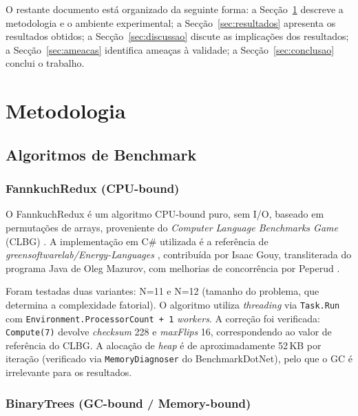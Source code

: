 \documentclass[12pt,a4paper]{article}
\begin{document}
O restante documento está organizado da seguinte forma: a Secção~\ref{sec:metodologia}
descreve a metodologia e o ambiente experimental; a Secção~\ref{sec:resultados}
apresenta os resultados obtidos; a Secção~\ref{sec:discussao} discute as
implicações dos resultados; a Secção~\ref{sec:ameacas} identifica ameaças à
validade; a Secção~\ref{sec:conclusao} conclui o trabalho.

\section{Metodologia}
\label{sec:metodologia}

\subsection{Algoritmos de Benchmark}
\label{sec:algoritmos}

\subsubsection{FannkuchRedux (CPU-bound)}

O FannkuchRedux é um algoritmo CPU-bound puro, sem I/O, baseado em permutações
de arrays, proveniente do \textit{Computer Language Benchmarks Game} (CLBG)
\cite{CLBG}.
A implementação em C\# utilizada é a referência de
\textit{greensoftwarelab/Energy-Languages} \cite{EnergyLanguages}, contribuída
por Isaac Gouy, transliterada do programa Java de Oleg Mazurov, com melhorias de
concorrência por Peperud \cite{Pereira2017}.

Foram testadas duas variantes: N=11 e N=12 (tamanho do problema, que determina
a complexidade fatorial).
O algoritmo utiliza \textit{threading} via \texttt{Task.Run} com
\texttt{Environment.ProcessorCount + 1} \textit{workers}.
A correção foi verificada: \texttt{Compute(7)} devolve \textit{checksum} 228 e
\textit{maxFlips} 16, correspondendo ao valor de referência do CLBG.
A alocação de \textit{heap} é de aproximadamente 52\,KB por iteração (verificado
via \texttt{MemoryDiagnoser} do BenchmarkDotNet), pelo que o GC é irrelevante
para os resultados.

\subsubsection{BinaryTrees (GC-bound / Memory-bound)}
\end{document}

